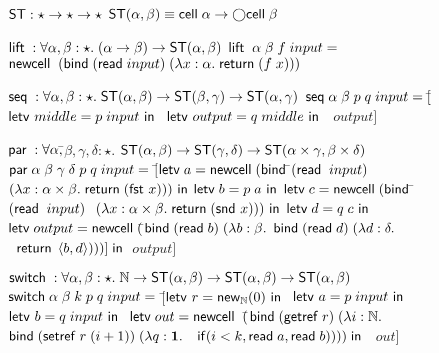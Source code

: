 \documentclass[preprint,natbib]{sigplanconf}
\begin{document}
\begin{figure}
{\small
\begin{specification}
$\mbox{\textsf{{ST}}} : \star \to \star \to \star$ \nextline
$\mbox{\textsf{{ST}}}({\alpha}, {\beta}) \equiv \mbox{\textsf{{cell}}}\;{\alpha} \to \bigcirc{\mbox{\textsf{{cell}}}\;{\beta}}$ 

$\mbox{\textsf{{lift}}}\; : \forall \alpha, \beta:\star.\; (\alpha \to \beta) \to \mbox{\textsf{{ST}}}({\alpha}, {\beta})$ \nextline
$\mbox{\textsf{{lift}}}\;\;\alpha\;\beta\;f\;input = $ \nextline
\;\; $\mbox{\textsf{{newcell}}}\; \;(\mbox{\textsf{{bind}}}\; (\mbox{\textsf{{read}}}\; input)\; (\lambda x:\alpha.\;\mbox{\textsf{{return}}}\; (f\;x)))$ 

$\mbox{\textsf{{seq}}}\; : \forall \alpha, \beta:\star.\; \mbox{\textsf{{ST}}}({\alpha}, {\beta}) \to \mbox{\textsf{{ST}}}({\beta}, {\gamma}) \to \mbox{\textsf{{ST}}}({\alpha}, {\gamma})$ \nextline
$\mbox{\textsf{{seq}}}\; \alpha\;\beta\;p\;q\;input = [$\=$\letv{middle}{p\;input}$ \nextline
                            \>$\letv{output}{q\;middle}$ \nextline 
                            \>$\;output]$ 

$\mbox{\textsf{{par}}}\; : \forall \alpha,$\=$\beta, \gamma, \delta:\star.$ \nextline
   \>$\mbox{\textsf{{ST}}}({\alpha}, {\beta}) \to \mbox{\textsf{{ST}}}({\gamma}, {\delta}) \to \mbox{\textsf{{ST}}}({\alpha \times \gamma}, {\beta \times \delta})$ \nextline
$\mbox{\textsf{{par}}}\; \alpha\;\beta\;\gamma\;\delta\; p \; q \; input = $ \nextline
\;\;$[$\=$\mbox{\textsf{{letv}}}\;a = \mbox{\textsf{{newcell}}}\; (\mbox{\textsf{{bind}}}\;$\=$(\mbox{\textsf{{read}}}\;\;input)$ \nextline
     \>                                   \>$(\lambda x:\alpha\times \beta.\;\mbox{\textsf{{return}}}\; (\mbox{\textsf{{fst }}} x))) \mbox{\textsf{{ in}}}$ \nextline
     \>$\mbox{\textsf{{letv}}}\;b = {p\;a} \mbox{\textsf{{ in}}}$ \nextline
     \>$\mbox{\textsf{{letv}}}\;c = \mbox{\textsf{{newcell}}}\; (\mbox{\textsf{{bind}}}\;$\=$(\mbox{\textsf{{read}}}\;\;input)\;$\nextline 
     \>                                   \>$(\lambda x:\alpha\times \beta.\;\mbox{\textsf{{return}}}\; (\mbox{\textsf{{snd }}} x))) \mbox{\textsf{{ in}}}$ \nextline
     \>$\mbox{\textsf{{letv}}}\;d = {q\;c} \mbox{\textsf{{ in}}} $ \nextline
     \>$\mbox{\textsf{{letv}}}\;output = \mbox{\textsf{{newcell}}}\; ($\=$\mbox{\textsf{{bind}}}\; (\mbox{\textsf{{read}}}\; b)\; (\lambda b:\beta.$ \nextline
     \>                                   \>$\mbox{\textsf{{bind}}}\; (\mbox{\textsf{{read}}}\; d)\; (\lambda d:\delta.$ \nextline
     \>                                   \>$\;\;\mbox{\textsf{{return}}}\; \left<{b},{d}\right>)))] \;\mbox{\textsf{{in}}}$ \nextline
     \>$\;output]$ 

$\mbox{\textsf{{switch}}}\; : \forall \alpha, \beta:\star.\; \mathbb{N} \to \mbox{\textsf{{ST}}}({\alpha}, {\beta}) \to \mbox{\textsf{{ST}}}({\alpha}, {\beta}) \to \mbox{\textsf{{ST}}}({\alpha}, {\beta})$ \nextline
$\mbox{\textsf{{switch}}}\; \alpha\;\beta\;k\;p\;q\; input =  $ \nextline
\;\;$[$\=$\mbox{\textsf{{letv }}}r = \mbox{\textsf{{new}}}_{\mathbb{N}}(0)\mbox{\textsf{{ in }}}$ \nextline
    \>$\letv{a}{p\;input}$ \nextline
    \>$\letv{b}{q\;input}$ \nextline
    \>$\mbox{\textsf{{letv}}}\; out = \mbox{\textsf{{newcell}}}\;\; ($\=$\mbox{\textsf{{bind}}}\; (\mbox{\textsf{{getref}}}\; r) \;(\lambda i:\mathbb{N}.\;$ \nextline
    \>                                 \>$\mbox{\textsf{{bind}}}\; (\mbox{\textsf{{setref}}}\; r\;(i+1)) \; (\lambda q:\mathbf{1}.$ \nextline
    \>                                 \>$\;\;\mbox{\textsf{{if}}}(i < k, \mbox{\textsf{{read}}}\; a, \mbox{\textsf{{read}}}\; b)))) \;\mbox{\textsf{{in}}}$ \nextline
    \>$\;\;out]$


\end{specification}}
\end{figure}
\end{document}
